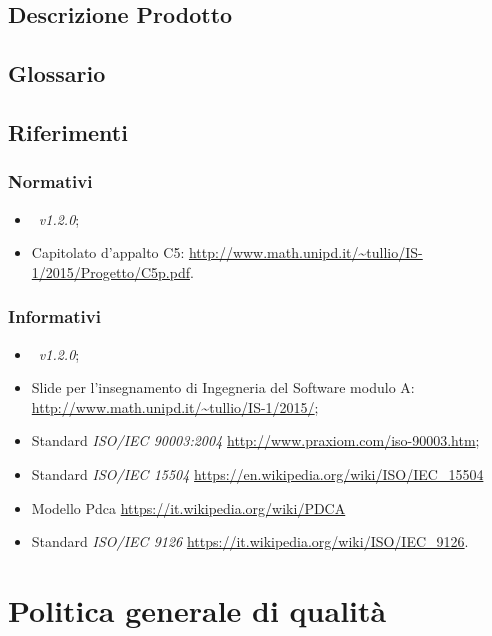 \documentclass[12pt,a4paper]{article}
\begin{document}
	\subsection{Descrizione Prodotto}
	\descrizioneProdotto
	
	\subsection{Glossario}
	\glossarioPrint
	
	\subsection{Riferimenti}
	
	\subsubsection{Normativi}
	\begin{itemize}
		\item \NdP\ \textit{v1.2.0};
		\item Capitolato d'appalto C5: \url{http://www.math.unipd.it/~tullio/IS-1/2015/Progetto/C5p.pdf}.
	\end{itemize}
	
	\subsubsection{Informativi}
	\begin{itemize}
		\item \PdP\ \textit{v1.2.0};
		\item Slide per l'insegnamento di Ingegneria del Software modulo A: \url{http://www.math.unipd.it/~tullio/IS-1/2015/};
		\item Standard \textit{ISO/IEC 90003:2004} \url{http://www.praxiom.com/iso-90003.htm};
		\item Standard \textit{ISO/IEC 15504} \url{https://en.wikipedia.org/wiki/ISO/IEC_15504}
		\item Modello Pdca \url{https://it.wikipedia.org/wiki/PDCA}
		\item Standard \textit{ISO/IEC 9126} \url{https://it.wikipedia.org/wiki/ISO/IEC_9126}.
	\end{itemize}
	
	\newpage
	
	\section{Politica generale di qualità}
	
\end{document}
